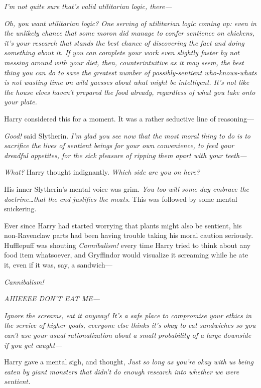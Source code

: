 \emph{I'm not quite sure that's valid utilitarian logic, there---}

\emph{Oh, you want utilitarian logic? One serving of utilitarian logic coming
up: even in the unlikely chance that some moron \emph{did} manage to confer
sentience on chickens, it's \emph{your} research that stands the best chance of
discovering the fact and doing something about it. If you can complete your
work even slightly faster by \emph{not} messing around with your diet, then,
counterintuitive as it may seem, the \emph{best} thing you can do to save the
greatest number of possibly-sentient who-knows-whats is \emph{not} wasting time
on wild guesses about what might be intelligent. It's not like the house elves
haven't prepared the food already, regardless of what you take onto your plate.}

Harry considered this for a moment. It was a rather seductive line of
reasoning---

\emph{Good!} said Slytherin. \emph{I'm glad you see now that the most moral
thing to do is to sacrifice the lives of sentient beings for your own
convenience, to feed your dreadful appetites, for the sick pleasure of ripping
them apart with your teeth---}

\emph{What?} Harry thought indignantly. \emph{Which side are you \emph{on} here?}

His inner Slytherin's mental voice was grim. \emph{You too will some day embrace
the doctrine…that the end justifies the meats.} This was followed by
some mental snickering.

Ever since Harry had started worrying that plants might also be sentient, his
non-Ravenclaw parts had been having trouble taking his moral caution
seriously. Hufflepuff was shouting \emph{Cannibalism!} every time Harry tried
to think about any food item whatsoever, and Gryffindor would visualize it
screaming while he ate it, even if it was, say, a sandwich---

\emph{Cannibalism!}

\emph{AIIIEEEE DON'T EAT ME---}

\emph{Ignore the screams, eat it anyway! It's a safe place to compromise your
ethics in the service of higher goals, everyone \emph{else} thinks it's okay to
eat sandwiches so you can't use your usual rationalization about a small
probability of a large downside if you get caught---}

Harry gave a mental sigh, and thought, \emph{Just so long as you're okay with
\emph{us} being eaten by giant monsters that didn't do enough research into
whether \emph{we} were sentient.}

